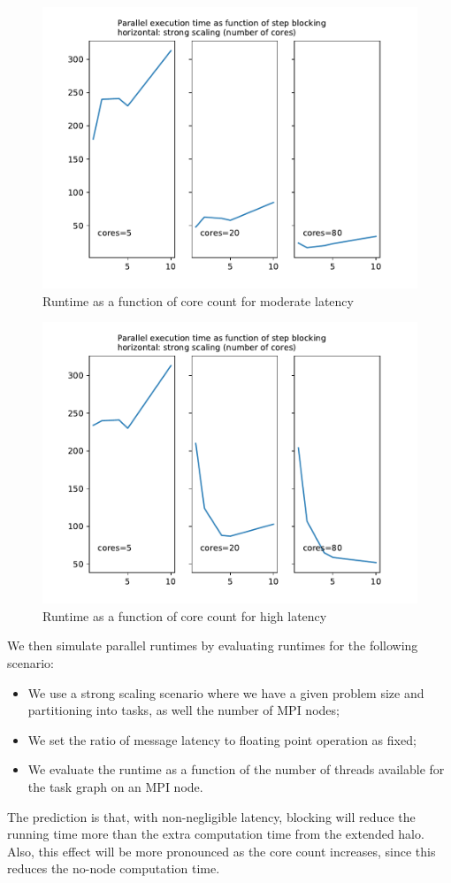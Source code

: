 \documentclass[11pt,fleqn]{article}
\begin{document}
\begin{figure}[ht]
  \includegraphics[scale=.6]{strongscale-1000}
  \caption{Runtime as a function of core count for moderate latency}
  \label{fig:lat1000}
\end{figure}
\begin{figure}[ht]
  \includegraphics[scale=.6]{strongscale-10000}
  \caption{Runtime as a function of core count for high latency}
  \label{fig:lat10000}
\end{figure}

We then simulate parallel runtimes by evaluating runtimes for the
following scenario:
\begin{itemize}
\item We use a strong scaling scenario where we have a given problem
  size and partitioning into tasks, as well the number of MPI nodes;
\item We set the ratio of message latency to floating point operation
  as fixed;
\item We evaluate the runtime as a function of the number of threads
  available for the task graph on an MPI node.
\end{itemize}
The prediction is that, with non-negligible latency, blocking will
reduce the running time more than the extra computation time from the
extended halo. Also, this effect will be more pronounced as the core
count increases, since this reduces the no-node computation time.
\end{document}
